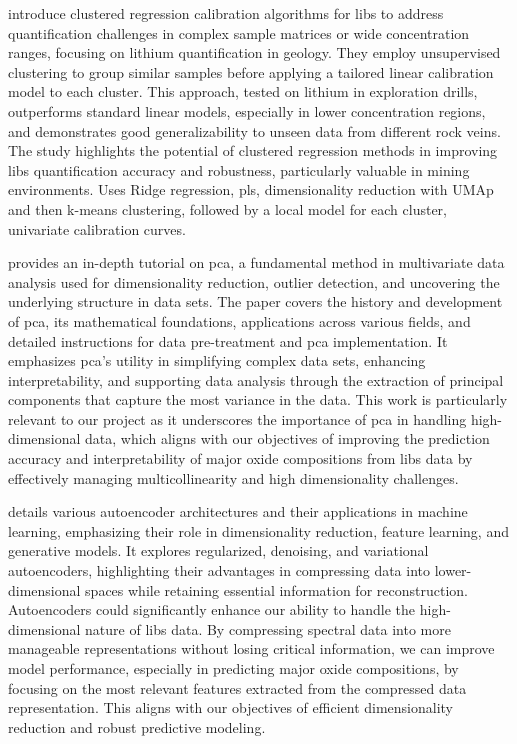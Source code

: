 \citet{silvaRobustCalibrationModels2022} introduce clustered regression calibration algorithms for \gls{libs} to address quantification challenges in complex sample matrices or wide concentration ranges, focusing on lithium quantification in geology.
They employ unsupervised clustering to group similar samples before applying a tailored linear calibration model to each cluster.
This approach, tested on lithium in exploration drills, outperforms standard linear models, especially in lower concentration regions, and demonstrates good generalizability to unseen data from different rock veins.
The study highlights the potential of clustered regression methods in improving \gls{libs} quantification accuracy and robustness, particularly valuable in mining environments.
Uses Ridge regression, \gls{pls}, dimensionality reduction with UMAp and then k-means clustering, followed by a local model for each cluster, univariate calibration curves.

\citet{woldPrincipalComponentAnalysis1987} provides an in-depth tutorial on \gls{pca}, a fundamental method in multivariate data analysis used for dimensionality reduction, outlier detection, and uncovering the underlying structure in data sets.
The paper covers the history and development of \gls{pca}, its mathematical foundations, applications across various fields, and detailed instructions for data pre-treatment and \gls{pca} implementation.
It emphasizes \gls{pca}'s utility in simplifying complex data sets, enhancing interpretability, and supporting data analysis through the extraction of principal components that capture the most variance in the data.
This work is particularly relevant to our project as it underscores the importance of \gls{pca} in handling high-dimensional data, which aligns with our objectives of improving the prediction accuracy and interpretability of major oxide compositions from \gls{libs} data by effectively managing multicollinearity and high dimensionality challenges.

\citet{bankAutoencoders2021} details various autoencoder architectures and their applications in machine learning, emphasizing their role in dimensionality reduction, feature learning, and generative models.
It explores regularized, denoising, and variational autoencoders, highlighting their advantages in compressing data into lower-dimensional spaces while retaining essential information for reconstruction.
Autoencoders could significantly enhance our ability to handle the high-dimensional nature of \gls{libs} data.
By compressing spectral data into more manageable representations without losing critical information, we can improve model performance, especially in predicting major oxide compositions, by focusing on the most relevant features extracted from the compressed data representation.
This aligns with our objectives of efficient dimensionality reduction and robust predictive modeling.
